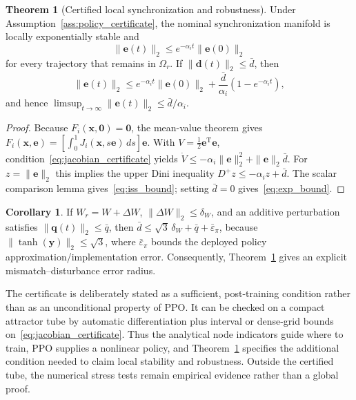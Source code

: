\documentclass[10pt,twocolumn]{article}
\newcommand{\rev}[1]{{\color{revisionblue}#1}}
\theoremstyle{definition}
\newtheorem{theorem}{Theorem}
\newtheorem{corollary}{Corollary}
\begin{document}
\begin{theorem}[Certified local synchronization and robustness]\label{thm:local_iss}
\rev{Under Assumption~\ref{ass:policy_certificate}, the nominal synchronization manifold is locally exponentially stable and
\begin{equation}
\|\mathbf e(t)\|_2\le e^{-\alpha_i t}\|\mathbf e(0)\|_2
\label{eq:exp_bound}
\end{equation}
for every trajectory that remains in $\Omega_r$. If $\|\mathbf d(t)\|_2\le\bar d$, then
\begin{equation}
\|\mathbf e(t)\|_2\le e^{-\alpha_i t}\|\mathbf e(0)\|_2+\frac{\bar d}{\alpha_i}(1-e^{-\alpha_i t}),
\label{eq:iss_bound}
\end{equation}
and hence $\limsup_{t\to\infty}\|\mathbf e(t)\|_2\le\bar d/\alpha_i$.}
\end{theorem}

\begin{proof}
\rev{Because $F_i(\mathbf{x},\mathbf0)=\mathbf0$, the mean-value theorem gives $F_i(\mathbf{x},\mathbf e)=\left[\int_0^1J_i(\mathbf{x},s\mathbf e)\,ds\right]\mathbf e$. With $V=\frac12\mathbf e^{\mathrm T}\mathbf e$, condition~\eqref{eq:jacobian_certificate} yields $\dot V\le-\alpha_i\|\mathbf e\|_2^2+\|\mathbf e\|_2\bar d$. For $z=\|\mathbf e\|_2$ this implies the upper Dini inequality $D^+z\le-\alpha_i z+\bar d$. The scalar comparison lemma gives~\eqref{eq:iss_bound}; setting $\bar d=0$ gives~\eqref{eq:exp_bound}.}
\end{proof}

\begin{corollary}\label{cor:mismatch_bound}
\rev{If $W_r=W+\Delta W$, $\|\Delta W\|_2\le\delta_W$, and an additive perturbation satisfies $\|\mathbf q(t)\|_2\le\bar q$, then $\bar d\le\sqrt{3}\,\delta_W+\bar q+\bar\varepsilon_\pi$, because $\|\tanh(\mathbf y)\|_2\le\sqrt3$, where $\bar\varepsilon_\pi$ bounds the deployed policy approximation/implementation error. Consequently, Theorem~\ref{thm:local_iss} gives an explicit mismatch--disturbance error radius.}
\end{corollary}

\rev{The certificate is deliberately stated as a sufficient, post-training condition rather than as an unconditional property of PPO. It can be checked on a compact attractor tube by automatic differentiation plus interval or dense-grid bounds on~\eqref{eq:jacobian_certificate}. Thus the analytical node indicators guide where to train, PPO supplies a nonlinear policy, and Theorem~\ref{thm:local_iss} specifies the additional condition needed to claim local stability and robustness. Outside the certified tube, the numerical stress tests remain empirical evidence rather than a global proof.}
\end{document}
